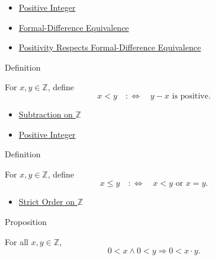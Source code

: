 \begin{dependencies}
\begin{itemize}
  \item \hyperref[def:positive-integer]{Positive Integer}
  \item \hyperref[def:formal-difference-equivalence]{Formal-Difference Equivalence}
  \item \hyperref[lem:positivity-respects-equivalence]{Positivity Respects Formal-Difference Equivalence}
\end{itemize}
\end{dependencies}

\begin{definitionbox}{Definition}
\begin{definition}
\label{def:strict-order-on-z}
For $x,y\in\mathbb{Z}$, define
\[
x<y \quad:\Longleftrightarrow\quad y-x \text{ is positive}.
\]
\end{definition}
\end{definitionbox}

\begin{dependencies}
\begin{itemize}
  \item \hyperref[def:subtraction-on-z]{Subtraction on $\mathbb{Z}$}
  \item \hyperref[def:positive-integer]{Positive Integer}
\end{itemize}
\end{dependencies}

\begin{definitionbox}{Definition}
\begin{definition}
\label{def:order-on-z}
For $x,y\in\mathbb{Z}$, define
\[
x\le y \quad:\Longleftrightarrow\quad x<y \text{ or } x=y.
\]
\end{definition}
\end{definitionbox}

\begin{dependencies}
\begin{itemize}
  \item \hyperref[def:strict-order-on-z]{Strict Order on $\mathbb{Z}$}
\end{itemize}
\end{dependencies}

\begin{propositionbox}{Proposition}
\begin{proposition}
\label{prop:product-of-positives-is-positive}
For all $x,y\in\mathbb{Z}$,
\[
0<x\land 0<y \Longrightarrow 0<x\cdot y.
\]
\end{proposition}
\end{propositionbox}

